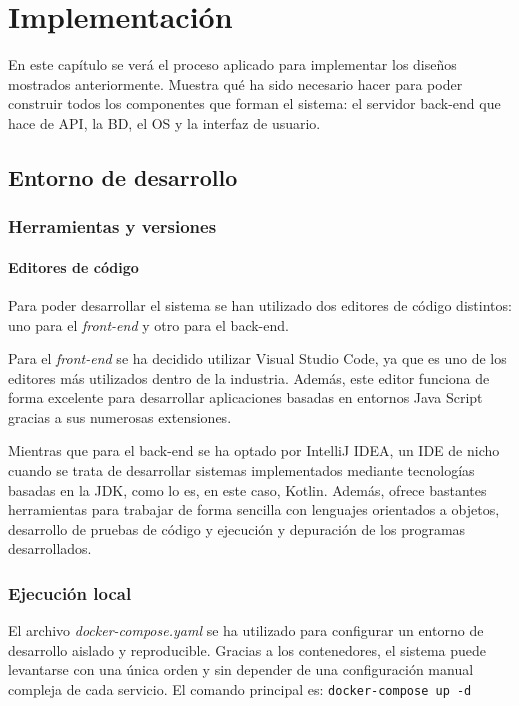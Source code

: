 \chapter{Implementación}
\label{ch:implementation}

En este capítulo se verá el proceso aplicado para implementar los diseños mostrados anteriormente. Muestra qué ha sido necesario hacer para poder construir todos los componentes que forman el sistema: el servidor back-end que hace de API, la \ac{BD}, el \ac{OS} y la interfaz de usuario.

\section{Entorno de desarrollo}

\subsection{Herramientas y versiones}

\subsubsection{Editores de código}
Para poder desarrollar el sistema se han utilizado dos editores de código distintos: uno para el \emph{front-end} y otro para el back-end.

Para el \emph{front-end} se ha decidido utilizar Visual Studio Code, ya que es uno de los editores más utilizados dentro de la industria. Además, este editor funciona de forma excelente para desarrollar aplicaciones basadas en entornos Java Script gracias a sus numerosas extensiones.

Mientras que para el back-end se ha optado por IntelliJ IDEA, un IDE de nicho cuando se trata de desarrollar sistemas implementados mediante tecnologías basadas en la JDK, como lo es, en este caso, Kotlin. Además, ofrece bastantes herramientas para trabajar de forma sencilla con lenguajes orientados a objetos, desarrollo de pruebas de código y ejecución y depuración de los programas desarrollados.

\subsection{Ejecución local}

El archivo \emph{docker-compose.yaml} se ha utilizado para configurar un entorno de desarrollo aislado y reproducible. Gracias a los contenedores, el sistema puede levantarse con una única orden y sin depender de una configuración manual compleja de cada servicio. El comando principal es:\newline
\texttt{docker-compose up -d}

